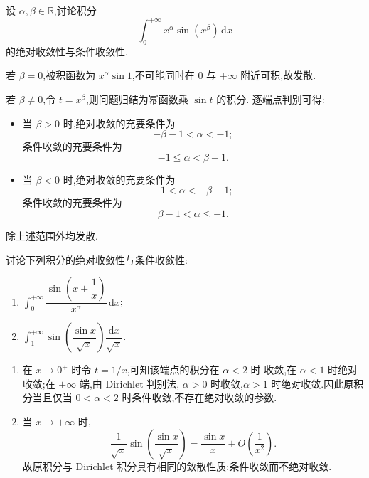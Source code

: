 \begin{example}
  设 $\alpha,\beta\in\mathbb{R}$,讨论积分
  \[
    \displaystyle\int_0^{+\infty}x^\alpha\sin(x^\beta)\,\mathrm{d}x
  \]
  的绝对收敛性与条件收敛性.
\end{example}
\exampleblank

\begin{solution}
  若 $\beta=0$,被积函数为 $x^\alpha\sin1$,不可能同时在 $0$ 与
  $+\infty$ 附近可积,故发散.

  若 $\beta\neq0$,令 $t=x^\beta$,则问题归结为幂函数乘 $\sin t$ 的积分.
  逐端点判别可得:
  \begin{itemize}
    \item 当 $\beta>0$ 时,绝对收敛的充要条件为
          \[
            -\beta-1<\alpha<-1;
          \]
          条件收敛的充要条件为
          \[
            -1\leq\alpha<\beta-1.
          \]
    \item 当 $\beta<0$ 时,绝对收敛的充要条件为
          \[
            -1<\alpha<-\beta-1;
          \]
          条件收敛的充要条件为
          \[
            \beta-1<\alpha\leq-1.
          \]
  \end{itemize}
  除上述范围外均发散.
\end{solution}

\begin{example}
  讨论下列积分的绝对收敛性与条件收敛性:
  \begin{enumerate}
    \item $\displaystyle\int_0^{+\infty}\dfrac{\sin\left(x+\dfrac{1}{x}\right)}{x^\alpha}\,\mathrm{d}x$;
    \item $\displaystyle\int_1^{+\infty}\sin\left(\dfrac{\sin x}{\sqrt{x}}\right)\dfrac{\mathrm{d}x}{\sqrt{x}}$.
  \end{enumerate}
\end{example}
\exampleblank

\begin{solution}
  \leavevmode
  \begin{enumerate}
    \item 在 $x\to0^+$ 时令 $t=1/x$,可知该端点的积分在 $\alpha<2$ 时
          收敛,在 $\alpha<1$ 时绝对收敛;在 $+\infty$ 端,由 Dirichlet 判别法,
          $\alpha>0$ 时收敛,$\alpha>1$ 时绝对收敛.因此原积分当且仅当
          $0<\alpha<2$ 时条件收敛,不存在绝对收敛的参数.

    \item 当 $x\to+\infty$ 时,
          \[
            \dfrac{1}{\sqrt{x}}\sin\left(\dfrac{\sin x}{\sqrt{x}}\right)
            =\dfrac{\sin x}{x}+O\left(\dfrac{1}{x^2}\right).
          \]
          故原积分与 Dirichlet 积分具有相同的敛散性质:条件收敛而不绝对收敛.
  \end{enumerate}
\end{solution}

